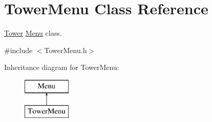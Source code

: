 \hypertarget{class_tower_menu}{\section{Tower\+Menu Class Reference}
\label{class_tower_menu}
}


\hyperlink{class_tower}{Tower} \hyperlink{class_menu}{Menu} class.  




{\ttfamily \#include $<$Tower\+Menu.\+h$>$}

Inheritance diagram for Tower\+Menu\+:\begin{figure}[H]
\begin{center}
\leavevmode
\includegraphics[height=2.000000cm]{class_tower_menu}
\end{center}
\end{figure}
